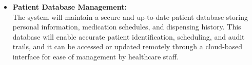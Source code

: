 \newpage

\begin{itemize}
    \setcounter{enumi}{5} %
    \item \textbf{Patient Database Management:} \\
    The system will maintain a secure and up-to-date patient database storing personal information, medication schedules, and dispensing history. This database will enable accurate patient identification, scheduling, and audit trails, and it can be accessed or updated remotely through a cloud-based interface for ease of management by healthcare staff.
\end{itemize}
